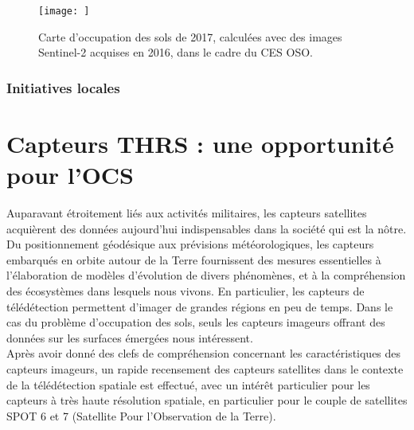 \begin{figure}
    \centering
    \texttt{[image: ]}
    \caption{Carte d'occupation des sols de 2017, calculées avec des images Sentinel-2 acquises en 2016, dans le cadre du CES OSO.}
    \label{fig:oso}
\end{figure}

\subsubsection{Initiatives locales}
\label{sssec:loc_ocs}

\section{Capteurs THRS : une opportunité pour l'OCS}
\label{sec:capteurs}
Auparavant étroitement liés aux activités militaires, les capteurs satellites acquièrent des données aujourd'hui indispensables dans la société qui est la nôtre. Du positionnement géodésique aux prévisions météorologiques, les capteurs embarqués en orbite autour de la Terre fournissent des mesures essentielles à l'élaboration de modèles d'évolution de divers phénomènes, et à la compréhension des écosystèmes dans lesquels nous vivons. En particulier, les capteurs de télédétection permettent d'imager de grandes régions en peu de temps. Dans le cas du problème d'occupation des sols, seuls les capteurs imageurs offrant des données sur les surfaces émergées nous intéressent.\\
Après avoir donné des clefs de compréhension concernant les caractéristiques des capteurs imageurs, un rapide recensement des capteurs satellites dans le contexte de la télédétection spatiale est effectué, avec un intérêt particulier pour les capteurs à très haute résolution spatiale, en particulier pour le couple de satellites SPOT 6 et 7 (Satellite Pour l’Observation de la Terre).

